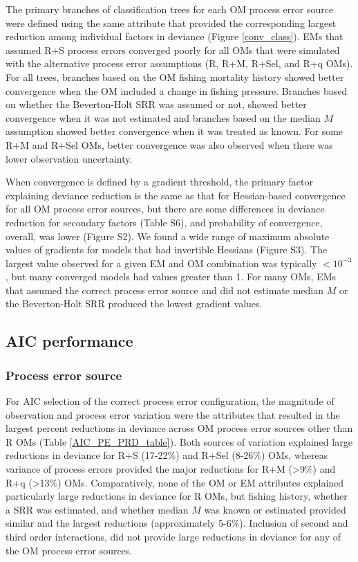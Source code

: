 \documentclass[
  12pt,
]{article}
\begin{document}
The primary branches of classification trees for each OM process error
source were defined using the same attribute that provided the
corresponding largest reduction among individual factors in deviance
(Figure \ref{conv_class}). EMs that assumed R+S process errors converged
poorly for all OMs that were simulated with the alternative process
error assumptions (R, R+M, R+Sel, and R+q OMs). For all trees, branches
based on the OM fishing mortality history showed better convergence when
the OM included a change in fishing pressure. Branches based on whether
the Beverton-Holt SRR was assumed or not, showed better convergence when
it was not estimated and branches based on the median \(M\) assumption
showed better convergence when it was treated as known. For some R+M and
R+Sel OMs, better convergence was also observed when there was lower
observation uncertainty.

When convergence is defined by a gradient threshold, the primary factor
explaining deviance reduction is the same as that for Hessian-based
convergence for all OM process error sources, but there are some
differences in deviance reduction for secondary factors (Table S6), and
probability of convergence, overall, was lower (Figure S2). We found a
wide range of maximum absolute values of gradients for models that had
invertible Hessians (Figure S3). The largest value observed for a given
EM and OM combination was typically \(<10^{-3}\), but many converged
models had values greater than 1. For many OMs, EMs that assumed the
correct process error source and did not estimate median \(M\) or the
Beverton-Holt SRR produced the lowest gradient values.

\subsection*{AIC performance}\label{aic-performance}

\subsubsection*{Process error source}\label{process-error-source}

For AIC selection of the correct process error configuration, the
magnitude of observation and process error variation were the attributes
that resulted in the largest percent reductions in deviance across OM
process error sources other than R OMs (Table \ref{AIC_PE_PRD_table}).
Both sources of variation explained large reductions in deviance for R+S
(17-22\%) and R+Sel (8-26\%) OMs, whereas variance of process errors
provided the major reductions for R+M (\textgreater9\%) and R+q
(\textgreater13\%) OMs. Comparatively, none of the OM or EM attributes
explained particularly large reductions in deviance for R OMs, but
fishing history, whether a SRR was estimated, and whether median \(M\)
was known or estimated provided similar and the largest reductions
(approximately 5-6\%). Inclusion of second and third order interactions,
did not provide large reductions in deviance for any of the OM process
error sources.
\end{document}
